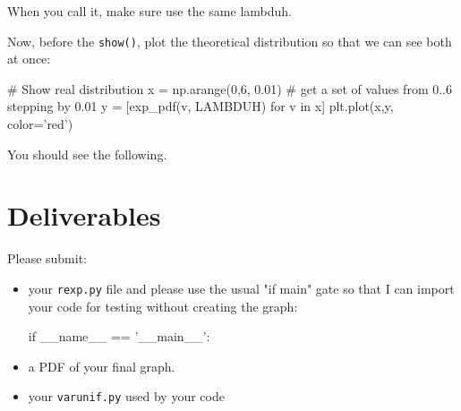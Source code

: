 \begin{fullwidth}
\noindent When you call it, make sure use the same lambduh.

\step Now, before the {\tt show()}, plot the theoretical distribution so that we can see both at once:

\begin{pyverbatim}
# Show real distribution
x = np.arange(0,6, 0.01) # get a set of values from 0..6 stepping by 0.01
y = [exp_pdf(v, LAMBDUH) for v in x]
plt.plot(x,y, color='red')
\end{pyverbatim}

\noindent You should see the following.\\


\section{Deliverables}

Please submit:

\begin{itemize}
\item your {\tt rexp.py} file and please use the usual "if main" gate so that I can import your code for testing without creating the graph:
\begin{pyverbatim}
if __name__ == '__main__':
\end{pyverbatim}

\item a PDF of your final graph.
\item your {\tt varunif.py} used by your code
\end{itemize}

\end{fullwidth}
